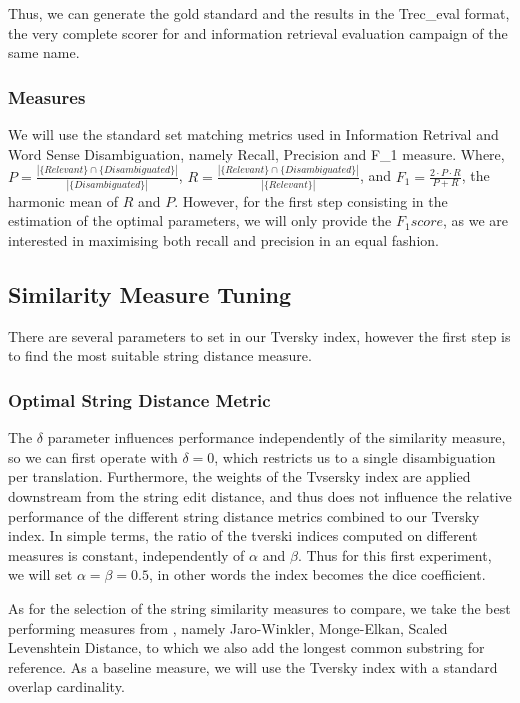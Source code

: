 \documentclass[10pt,a4paper,twoside]{article}
\begin{document}
Thus, we can generate the gold standard and the results in the Trec\_eval format, the very complete scorer for and information retrieval evaluation campaign of the same name.

\subsubsection{Measures}
We will use the standard set matching metrics used in Information Retrival and Word Sense Disambiguation, namely Recall, Precision and F\_{1} measure. Where, \(P=\frac{|\{Relevant\}\cap\{Disambiguated\}|}{|\{Disambiguated\}|}\), \(R=\frac{|\{Relevant\}\cap\{Disambiguated\}|}{|\{Relevant\}|}\), and \(F_1 = \frac{2\cdot P \cdot R}{P + R} \), the harmonic mean of \(R\) and \(P\). However, for the first step consisting in the estimation of the optimal parameters, we will only provide the \(F_1 score\), as we are interested in maximising both recall and precision in an equal fashion.
\subsection{Similarity Measure Tuning}
There are several parameters to set in our Tversky index, however the first step is to find the most suitable string distance measure.

\subsubsection{Optimal String Distance Metric}
 The \(\delta\) parameter influences performance independently of the similarity measure, so we can first operate with \(\delta=0\), which restricts us to a single disambiguation per translation. Furthermore, the weights of the Tvsersky index are applied downstream from the string edit distance, and thus does not influence the relative performance of the different string distance metrics combined to our Tversky index. In simple terms, the ratio of the tverski indices computed on different measures is constant, independently of \(\alpha\) and \(\beta\).  Thus for this first experiment, we will set \(\alpha=\beta=0.5\), in other words the index becomes the dice coefficient.

As for the selection of the string similarity measures to compare, we take the best performing measures from \cite{Cohen2003}, namely Jaro-Winkler, Monge-Elkan, Scaled Levenshtein Distance, to which we also add the longest common substring for reference. As a baseline measure, we will use the Tversky index with a standard overlap cardinality.
\end{document}
